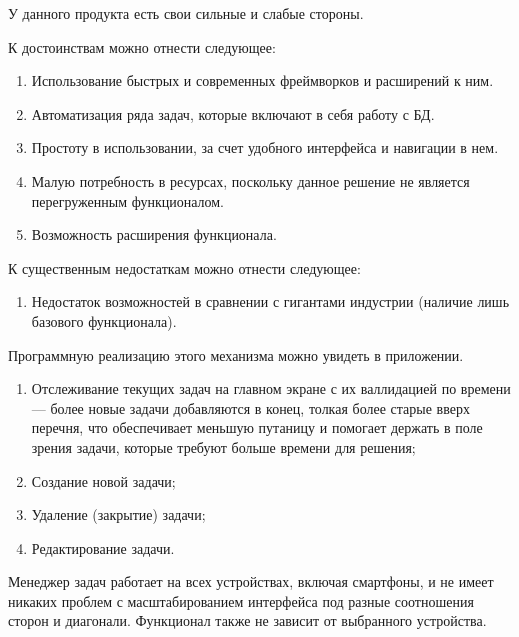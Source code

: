 \documentclass{altsu-report}
\begin{document}
У данного продукта есть свои сильные и слабые стороны.

К достоинствам можно отнести следующее:

\begin{enumerate}
    \item Использование быстрых и современных фреймворков и расширений к ним.

    \item Автоматизация ряда задач, которые включают в себя работу с БД.

    \item Простоту в использовании, за счет удобного интерфейса и навигации в нем.

    \item Малую потребность в ресурсах, поскольку данное решение не является перегруженным функционалом.

    \item Возможность расширения функционала.
\end{enumerate}

К существенным недостаткам можно отнести следующее:

\begin{enumerate}
    \item Недостаток возможностей в сравнении с гигантами индустрии (наличие лишь базового функционала).
\end{enumerate}

Программную реализацию этого механизма можно увидеть в приложении.

\begin{enumerate}
    \item Отслеживание текущих задач на главном экране с их валлидацией по времени --- более новые задачи добавляются в конец, толкая более старые вверх перечня, что обеспечивает меньшую путаницу и помогает держать в поле зрения задачи, которые требуют больше времени для решения;

    \item Создание новой задачи;

    \item Удаление (закрытие) задачи;

    \item Редактирование задачи.
\end{enumerate}

Менеджер задач работает на всех устройствах, включая смартфоны, и не имеет никаких проблем с масштабированием интерфейса под разные соотношения сторон и диагонали. Функционал также не зависит от выбранного устройства.
\end{document}

